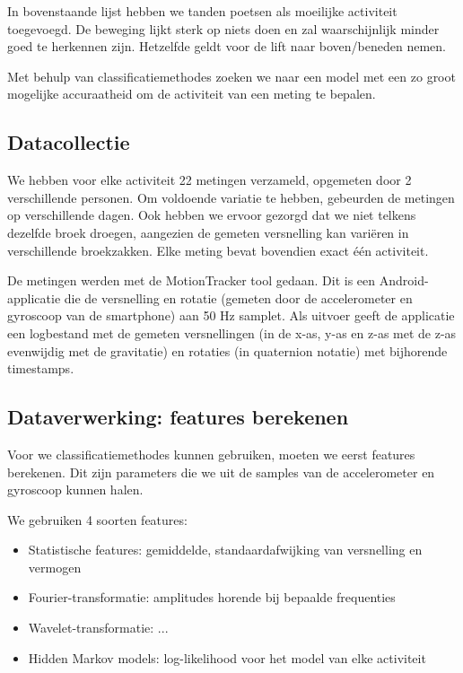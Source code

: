 \documentclass{article}
\begin{document}
In bovenstaande lijst hebben we tanden poetsen als moeilijke activiteit toegevoegd. De beweging lijkt sterk op niets doen en zal waarschijnlijk minder goed te herkennen zijn. Hetzelfde geldt voor de lift naar boven/beneden nemen.

Met behulp van classificatiemethodes zoeken we naar een model met een zo groot mogelijke accuraatheid om de activiteit van een meting te bepalen.


\subsection{Datacollectie}

We hebben voor elke activiteit 22 metingen verzameld, opgemeten door 2 verschillende personen. Om voldoende variatie te hebben, gebeurden de metingen op verschillende dagen. Ook hebben we ervoor gezorgd dat we niet telkens dezelfde broek droegen, aangezien de gemeten versnelling kan vari\"eren in verschillende broekzakken. Elke meting bevat bovendien exact \'e\'en activiteit.

De metingen werden met de MotionTracker
tool gedaan. Dit is een Android-applicatie die de versnelling en rotatie (gemeten door de accelerometer en gyroscoop van de smartphone) aan 50 Hz samplet. Als uitvoer geeft de applicatie een logbestand met de gemeten versnellingen (in de x-as, y-as en z-as met de z-as evenwijdig met de gravitatie) en rotaties (in quaternion notatie) met bijhorende timestamps.

\subsection{Dataverwerking: features berekenen}

Voor we classificatiemethodes kunnen gebruiken, moeten we eerst features berekenen. Dit zijn parameters die we uit de samples van de accelerometer en gyroscoop kunnen halen.

We gebruiken 4 soorten features:
\begin{itemize}
\item Statistische features: gemiddelde, standaardafwijking van versnelling en vermogen
\item Fourier-transformatie: amplitudes horende bij bepaalde frequenties
\item Wavelet-transformatie: ... %
\item Hidden Markov models: log-likelihood voor het model van elke activiteit
\end{itemize}
\end{document}
